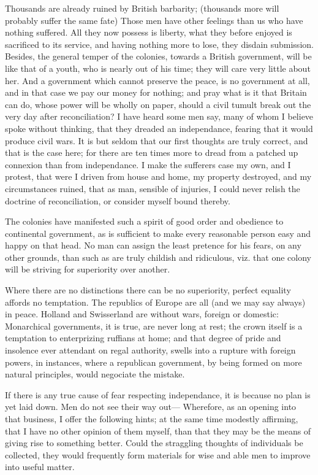 \documentclass[12pt,oneside]{memoir}
\begin{document}
Thousands are already ruined by British barbarity; (thousands more will probably suffer the same fate) Those men have other feelings than us who have nothing suffered. All they now possess is liberty, what they before enjoyed is sacrificed to its service, and having nothing more to lose, they disdain submission. Besides, the general temper of the colonies, towards a British government, will be like that of a youth, who is nearly out of his time; they will care very little about her. And a government which cannot preserve the peace, is no government at all, and in that case we pay our money for nothing; and pray what is it that Britain can do, whose power will be wholly on paper, should a civil tumult break out the very day after reconciliation? I have heard some men say, many of whom I believe spoke without thinking, that they dreaded an independance, fearing that it would produce civil wars. It is but seldom that our first thoughts are truly correct, and that is the case here; for there are ten times more to dread from a patched up connexion than 
from independance. I make the sufferers case my own, and I protest, that were I driven from house and home, my property destroyed, and my circumstances ruined, that as man, sensible of injuries, I could never relish the doctrine of reconciliation, or consider myself bound thereby.

The colonies have manifested such a spirit of good order and obedience to continental government, as is sufficient to make every reasonable person easy and happy on that head. No man can assign the least pretence for his fears, on any other grounds, than such as are truly childish and ridiculous, viz. that one colony will be striving for superiority over another.

Where there are no distinctions there can be no superiority, perfect equality affords no temptation. The republics of Europe are all (and we may say always) in peace. Holland and Swisserland are without wars, foreign or domestic: Monarchical governments, it is true, are never long at rest; the crown itself is a temptation to enterprizing ruffians at home; and that degree of pride and insolence ever attendant on regal authority, swells into a rupture with foreign powers, in instances, where a republican government, by being formed on more natural principles, would negociate the mistake.

If there is any true cause of fear respecting independance, it is because no plan is yet laid down. Men do not see their way out--- Wherefore, as an opening into that business, I offer the following hints; at the same time modestly affirming, that I have no other opinion of them myself, than that they may be the means of giving rise to something better. Could the straggling thoughts of individuals be collected, they would frequently form materials for wise and able men to improve into useful matter.
\end{document}
